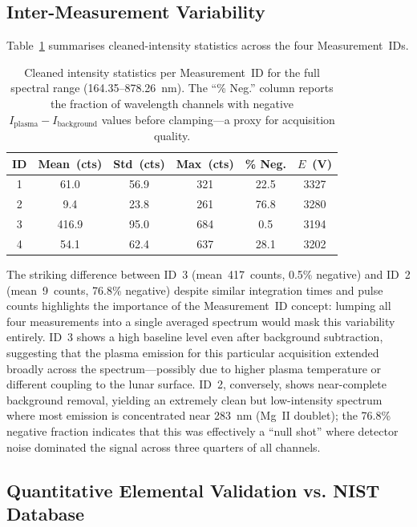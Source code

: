 \documentclass[a4paper,twocolumn,10pt]{article}
\begin{document}
\subsection{Inter-Measurement Variability}

Table~\ref{tab:measurement_stats} summarises cleaned-intensity
statistics across the four Measurement~IDs.

\begin{table}[!t]
\centering
\caption{Cleaned intensity statistics per Measurement~ID for the
  full spectral range (164.35--878.26~nm).  The ``\% Neg.'' column
  reports the fraction of wavelength channels with negative
  $I_{\text{plasma}} - I_{\text{background}}$ values before
  clamping---a proxy for acquisition quality.}
\label{tab:measurement_stats}
{\small
\begin{tabularx}{\textwidth}{@{}cccccc@{}}
\toprule
\textbf{ID} & \textbf{Mean~(cts)} & \textbf{Std~(cts)} &
  \textbf{Max~(cts)} & \textbf{\% Neg.} & \textbf{$E$~(V)} \\
\midrule
1 & 61.0  & 56.9  & 321  & 22.5 & 3327 \\
2 & 9.4   & 23.8  & 261  & 76.8 & 3280 \\
3 & 416.9 & 95.0  & 684  & 0.5  & 3194 \\
4 & 54.1  & 62.4  & 637  & 28.1 & 3202 \\
\bottomrule
\end{tabularx}
}
\end{table}

The striking difference between ID~3 (mean~417~counts, 0.5\% negative)
and ID~2 (mean~9~counts, 76.8\% negative) despite similar integration
times and pulse counts
highlights the importance of the Measurement~ID concept: lumping all
four measurements into a single averaged spectrum would mask this
variability entirely.  ID~3 shows a high baseline level even after
background subtraction, suggesting that the plasma emission for this
particular acquisition extended broadly across the spectrum---possibly
due to higher plasma temperature or different coupling to the lunar
surface.  ID~2, conversely, shows near-complete background removal,
yielding an extremely clean but low-intensity spectrum where most
emission is concentrated near 283~nm (Mg~II doublet); the 76.8\%
negative fraction indicates that this was effectively a ``null shot''
where detector noise dominated the signal across three quarters of
all channels.

\subsection{Quantitative Elemental Validation vs. NIST Database}
\end{document}
